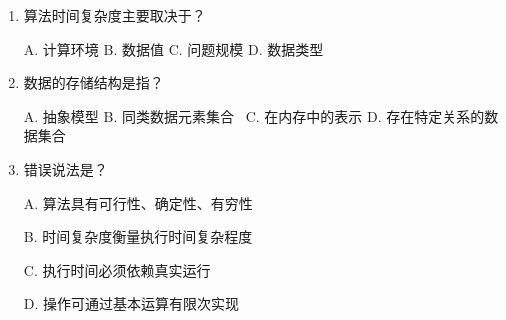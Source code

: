 \documentclass[lang=cn,newtx,10pt,scheme=chinese]{../../elegantbook}
\begin{document}
\begin{enumerate}
    \item 算法时间复杂度主要取决于？\
   
    A. 计算环境 \quad B. 数据值 \quad C. 问题规模 \quad D. 数据类型

    \item 数据的存储结构是指？\
    
    A. 抽象模型 \quad B. 同类数据元素集合 \
    C. 在内存中的表示 \quad D. 存在特定关系的数据集合

    \item 错误说法是？\
   
    A. 算法具有可行性、确定性、有穷性 \

    B. 时间复杂度衡量执行时间复杂程度 \

    C. 执行时间必须依赖真实运行 \

    D. 操作可通过基本运算有限次实现
\end{enumerate}
\end{document}
